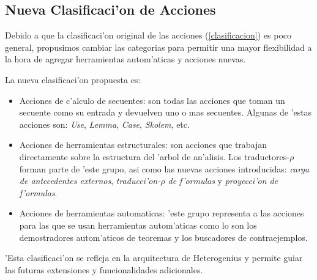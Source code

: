 \subsection{Nueva Clasificaci'on de Acciones}

Debido a que la clasificaci'on original de las acciones (\ref{clasificacion}) es poco general, propusimos cambiar las categorias para permitir una mayor flexibilidad a la hora de agregar herramientas autom'aticas y acciones nuevas.

La nueva clasificaci'on propuesta es:

\begin{itemize}
\item Acciones de c'alculo de secuentes: son todas las acciones que toman un secuente como su entrada y devuelven uno o mas secuentes. Algunas de 'estas acciones son: \textit{Use}, \textit{Lemma}, \textit{Case}, \textit{Skolem}, etc.

\item Acciones de herramientas estructurales: son acciones que trabajan directamente sobre la estructura del 'arbol de an'alisis. Los traductores-$\rho$ forman parte de 'este grupo, asi como las nuevas acciones introducidas: \textit{carga de antecedentes externos}, \textit{traducci'on-$\rho$ de f'ormulas} y \textit{proyecci'on de f'ormulas}.

\item Acciones de herramientas automaticas: 'este grupo representa a las acciones para las que se usan herramientas autom'aticas como lo son los demostradores autom'aticos de teoremas y los buscadores de contraejemplos.
\end{itemize}

'Esta clasificaci'on se refleja en la arquitectura de Heterogenius y permite guiar las futuras extensiones y funcionalidades adicionales.